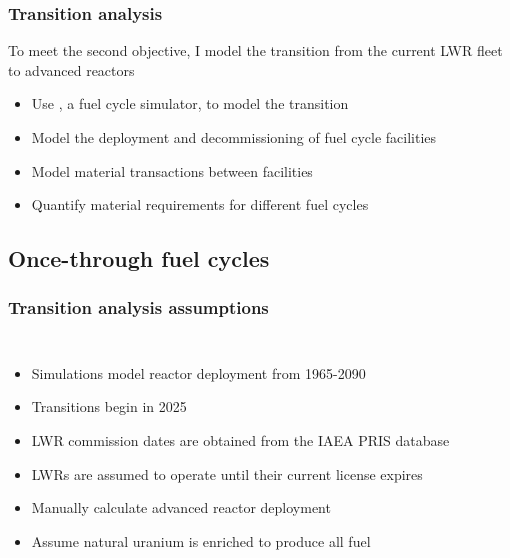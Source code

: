 \begin{frame}
    \frametitle{Transition analysis}
    To meet the second objective, I model the transition from the current 
    \gls{LWR} fleet to advanced reactors
    \begin{itemize}
        \item<2-> Use \Cyclus \cite{huff_fundamental_2016}, 
              a fuel cycle simulator, to model the transition
        \item<3-> Model the deployment and decommissioning of fuel cycle facilities 
        \item<3-> Model material transactions between facilities
        \item<4-> Quantify material requirements for different fuel cycles
    \end{itemize}

\end{frame}

\subsection{Once-through fuel cycles}
\begin{frame}
    \frametitle{Transition analysis assumptions}
    \begin{columns}
        
    \column[t]{6cm}
    \vspace{-0.9cm}
    

        \column[t]{4.5cm}
        \begin{itemize}
            \item Simulations model reactor deployment from 1965-2090
            \item Transitions begin in 2025
            \item<2-> \gls{LWR} commission dates are obtained from the IAEA PRIS
                database \cite{noauthor_power_1989}
            \item<2-> \glspl{LWR} are assumed to operate until their current license 
                expires
            \item<3-> Manually calculate advanced reactor deployment
            \item<3-> Assume natural uranium is enriched to produce all 
                  fuel
        \end{itemize}

\end{columns}
\end{frame}

